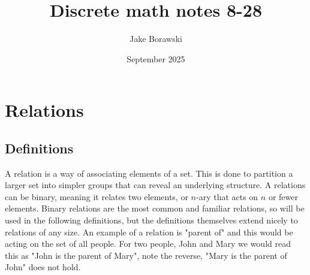 \documentclass{article}
\title{Discrete math notes 8-28}
\author{Jake Borawski}
\date{September 2025}
\begin{document}
\maketitle

\section{Relations}

\subsection{Definitions}
A relation is a way of associating elements of a set. This is done to partition a larger set into simpler groups that can reveal an underlying structure. A relations can be binary, meaning it relates two elements, or $n$-ary that acts on $n$ or fewer elements. Binary relations are the most common and familiar relations, so will be used in the following definitions, but the definitions themselves extend nicely to relations of any size. An example of a relation is "parent of" and this would be acting on the set of all people. For two people, John and Mary we would read this as "John is the parent of Mary", note the reverse, "Mary is the parent of John" does not hold.
\end{document}
